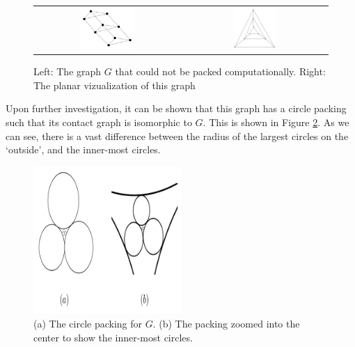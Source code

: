\begin{figure}[htbp]
    \centering
    \begin{tabular}{c | c}
        \includegraphics[width = 0.4\textwidth]{Chapter 4/14. interesting graph.png} & \hspace{5 mm} \includegraphics[width = 0.3\textwidth]{Chapter 4/15. interesting planar.png}   
    \end{tabular}
    \caption{Left: The graph $G$ that could not be packed computationally. Right: The planar vizualization of this graph}
    \label{fig4: interesting}
\end{figure}

\begin{flushleft}
Upon further investigation, it can be shown that this graph has a circle packing such that its contact graph is isomorphic to $G$. This is shown in Figure \ref{fig4: interesting packing}. As we can see, there is a vast difference between the radius of the largest circles on the `outside', and the inner-most circles. 
\end{flushleft}

\begin{figure}[htbp]
    \centering
    \includegraphics[width = 0.5\textwidth]{Chapter 4/16. interesting circle packing.png}
    \caption{(a) The circle packing for $G$. (b) The packing zoomed into the center to show the inner-most circles.}
    \label{fig4: interesting packing}
\end{figure}

